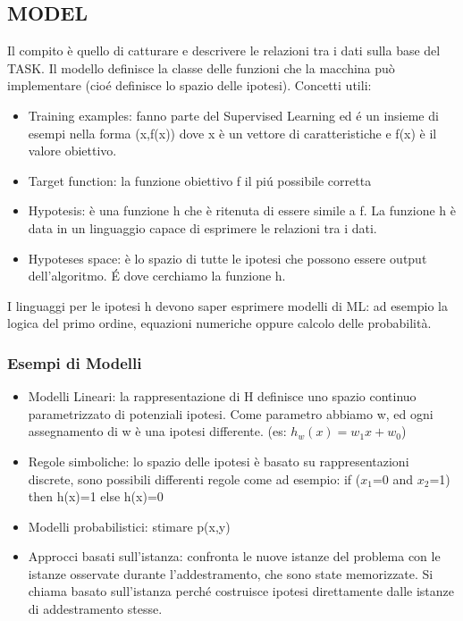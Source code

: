 \documentclass{article}
\begin{document}
\subsection{MODEL}
Il compito è quello di catturare e descrivere le relazioni tra i dati sulla base del TASK. Il modello definisce la classe delle funzioni che la macchina può implementare (cioé definisce lo spazio delle ipotesi). \newline
Concetti utili: 
\begin{itemize}
    \item Training examples: fanno parte del Supervised Learning ed é un insieme di esempi nella forma (x,f(x)) dove x è un vettore di caratteristiche e f(x) è il valore obiettivo.
    \item Target function: la funzione obiettivo f il piú possibile corretta
    \item Hypotesis: è una funzione h che è ritenuta di essere simile a f. La funzione h è data in un linguaggio capace di esprimere le relazioni tra i dati.
    \item Hypoteses space: è lo spazio di tutte le ipotesi che possono essere output dell'algoritmo. É dove cerchiamo la funzione h. 
\end{itemize}
I linguaggi per le ipotesi h devono saper esprimere modelli di ML: ad esempio la logica del primo ordine, equazioni numeriche oppure calcolo delle probabilità.

\subsubsection{Esempi di Modelli}
\begin{itemize}
    \item Modelli Lineari: la rappresentazione di H definisce uno spazio continuo parametrizzato di potenziali ipotesi. Come parametro abbiamo w, ed ogni assegnamento di w è una ipotesi differente. (es: $h_w(x)=w_1x+w_0$)
    \item Regole simboliche: lo spazio delle ipotesi è basato su rappresentazioni discrete, sono possibili differenti regole come ad esempio: if ($x_1$=0 and $x_2$=1) then h(x)=1 else h(x)=0
    \item Modelli probabilistici: stimare p(x,y)
    \item Approcci basati sull'istanza: confronta le nuove istanze del problema con le istanze osservate durante l'addestramento, che sono state memorizzate. Si chiama basato sull'istanza perché costruisce ipotesi direttamente dalle istanze di addestramento stesse.
\end{itemize}
\end{document}
